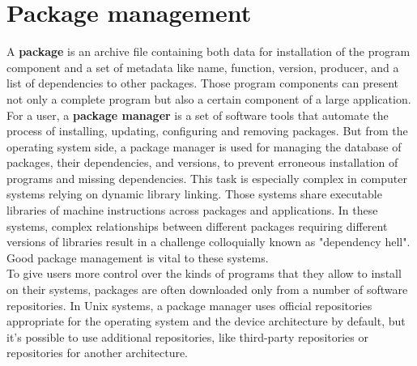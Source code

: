 \section{Package management} \label{sec:pm}
A \textbf{package} is an archive file containing both data for installation of the program component and a set of metadata like name, function, version, producer, and a list of dependencies to other packages. 
Those program components can present not only a complete program but also a certain component of a large application. %
For a user, a \textbf{package manager} is a set of software tools that automate the process of installing, updating, configuring and removing packages.
But from the operating system side, a package manager is used for managing the database of packages, their dependencies, and versions, to prevent erroneous installation of programs and missing dependencies.
This task is especially complex in computer systems relying on dynamic library linking. Those systems share executable libraries of machine instructions across packages and applications. 
In these systems, complex relationships between different packages requiring different versions of libraries result in a challenge colloquially known as "dependency hell".
Good package management is vital to these systems.\\
To give users more control over the kinds of programs that they allow to install on their systems, packages are often downloaded only from a number of software repositories.
In Unix systems, a package manager uses official repositories appropriate for the operating system and the device architecture by default, but it's possible to use additional repositories, like third-party repositories or repositories for another architecture.\\
